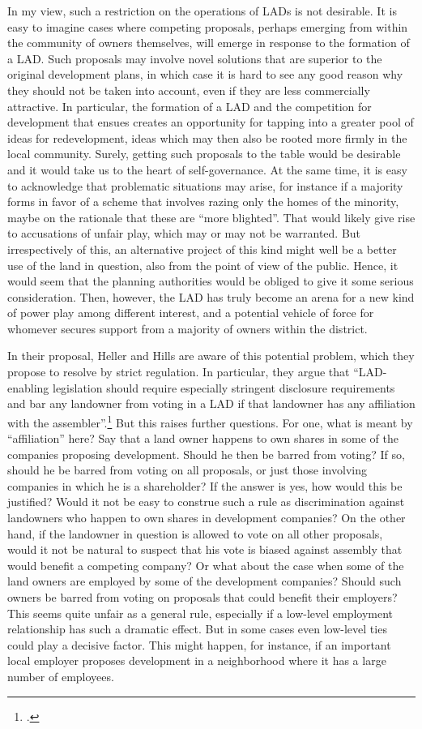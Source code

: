 \documentclass[12pt,a4paper]{book} %
\begin{document}
In my view, such a restriction on the operations of LADs is not desirable. It is easy to imagine cases where competing proposals, perhaps emerging from within the community of owners themselves, will emerge in response to the formation of a LAD. Such proposals may involve novel solutions that are superior to the original development plans, in which case it is hard to see any good reason why they should not be taken into account, even if they are less commercially attractive. In particular, the formation of a LAD and the competition for development that ensues creates an opportunity for tapping into a greater pool of ideas for redevelopment, ideas which may then also be rooted more firmly in the local community. Surely, getting such proposals to the table would be desirable and it would take us to the heart of self-governance. At the same time, it is easy to acknowledge that problematic situations may arise, for instance if a majority forms in favor of a scheme that involves razing only the homes of the minority, maybe on the rationale that these are ``more blighted''. That would likely give rise to accusations of unfair play, which may or may not be warranted. But irrespectively of this, an alternative project of this kind might well be a better use of the land in question, also from the point of view of the public. Hence, it would seem that the planning authorities would be obliged to give it some serious consideration. Then, however, the LAD has truly become an arena for a new kind of power play among different interest, and a potential vehicle of force for whomever secures support from a majority of owners within the district.

In their proposal, Heller and Hills are aware of this potential problem, which they propose to resolve by strict regulation. In particular, they argue that ``LAD-enabling legislation should require especially stringent disclosure requirements and bar any landowner from voting in a LAD if that landowner has any affiliation with the assembler''.\footcite{heller08} But this raises further questions. For one, what is meant by ``affiliation'' here? Say that a land owner happens to own shares in some of the companies proposing development. Should he then be barred from voting? If so, should he be barred from voting on all proposals, or just those involving companies in which he is a shareholder? If the answer is yes, how would this be justified? Would it not be easy to construe such a rule as discrimination against landowners who happen to own shares in development companies? On the other hand, if the landowner in question is allowed to vote on all other proposals, would it not be natural to suspect that his vote is biased against assembly that would benefit a competing company? Or what about the case when some of the land owners are employed by some of the development companies? Should such owners be barred from voting on proposals that could benefit their employers? This seems quite unfair as a general rule, especially if a low-level employment relationship has such a dramatic effect. But in some cases even low-level ties could play a decisive factor. This might happen, for instance, if an important local employer proposes development in a neighborhood where it has a large number of employees.
\end{document}
